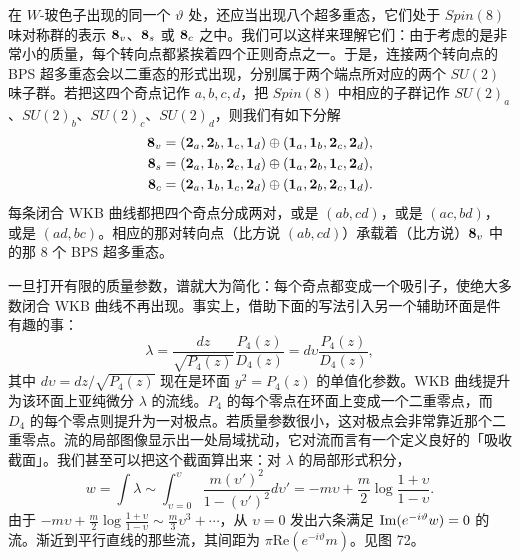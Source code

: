 在 $W$-玻色子出现的同一个 $\vartheta$ 处，还应当出现八个超多重态，它们处于 $Spin(8)$ 味对称群的表示 ${\bf 8}_v$、${\bf 8}_s$ 或 ${\bf 8}_c$ 之中。我们可以这样来理解它们：由于考虑的是非常小的质量，每个转向点都紧挨着四个正则奇点之一。于是，连接两个转向点的 BPS 超多重态会以二重态的形式出现，分别属于两个端点所对应的两个 $SU(2)$ 味子群。若把这四个奇点记作 $a,b,c,d$，把 $Spin(8)$ 中相应的子群记作 $SU(2)_a$、$SU(2)_b$、$SU(2)_c$、$SU(2)_d$，则我们有如下分解
\begin{equation}
\begin{aligned}
{\bf 8}_v &= ({\bf 2}_a, {\bf 2}_b, {\bf 1}_c, {\bf 1}_d) \oplus ({\bf 1}_a, {\bf 1}_b, {\bf 2}_c, {\bf 2}_d), \\
{\bf 8}_s &= ({\bf 2}_a, {\bf 1}_b, {\bf 2}_c, {\bf 1}_d) \oplus ({\bf 1}_a, {\bf 2}_b, {\bf 1}_c, {\bf 2}_d), \\
{\bf 8}_c &= ({\bf 2}_a, {\bf 1}_b, {\bf 1}_c, {\bf 2}_d) \oplus ({\bf 1}_a, {\bf 2}_b, {\bf 2}_c, {\bf 1}_d).
\end{aligned}
\end{equation}
每条闭合 WKB 曲线都把四个奇点分成两对，或是 $(ab,cd)$，或是 $(ac,bd)$，或是 $(ad,bc)$。相应的那对转向点（比方说 $(ab,cd)$）承载着（比方说）${\bf 8}_v$ 中的那 8 个 BPS 超多重态。

一旦打开有限的质量参数，谱就大为简化：每个奇点都变成一个吸引子，使绝大多数闭合 WKB 曲线不再出现。事实上，借助下面的写法引入另一个辅助环面是件有趣的事：
\begin{equation}
\lambda = \frac{dz}{\sqrt{P_4(z)}}\frac{P_4(z)}{D_4(z)}= d\upsilon
\frac{P_4(z)}{D_4(z)},
\end{equation}
其中 $d\upsilon = dz/\sqrt{P_4(z)}$ 现在是环面 $y^2=P_4(z)$ 的单值化参数。WKB 曲线提升为该环面上亚纯微分 $\lambda$ 的流线。$P_4$ 的每个零点在环面上变成一个二重零点，而 $D_4$ 的每个零点则提升为一对极点。若质量参数很小，这对极点会非常靠近那个二重零点。流的局部图像显示出一处局域扰动，它对流而言有一个定义良好的「吸收截面」。我们甚至可以把这个截面算出来：对 $\lambda$ 的局部形式积分，
\begin{equation}
w = \int \lambda \sim \int_{\upsilon=0}^{\upsilon} \frac{m
(\upsilon')^2}{1-(\upsilon')^2}d\upsilon' = - m \upsilon +
\frac{m}{2}\log \frac{1+\upsilon}{1-\upsilon}.
\end{equation}
由于 $- m \upsilon + \frac{m}{2}\log
\frac{1+\upsilon}{1-\upsilon}\sim \frac{m}{3}\upsilon^3 + \cdots$，从 $\upsilon=0$ 发出六条满足 ${\rm Im}(e^{-i \vartheta} w) =0$ 的流。渐近到平行直线的那些流，其间距为 $\pi \mathrm{Re}\left( e^{-i \vartheta}m \right)$。见图 72。

